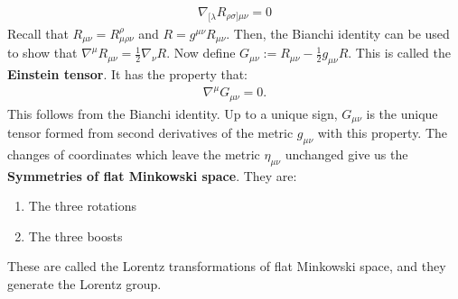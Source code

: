 \documentclass[11pt]{article}
\newcommand{\srmetric}[0]{\eta_{\mu \nu}}
\newcommand{\grmetric}[0]{g_{\mu \nu}}
\theoremstyle{definition}
\begin{document}
\begin{align}
	\boxed{\nabla_{[ \lambda} R_{\rho \sigma]\mu \nu} = 0}	
\end{align}
Recall that \( R_{\mu \nu} = R^{\rho}_{\mu \rho \nu} \) and \( R = g^{\mu \nu} R_{\mu \nu} \). Then, the Bianchi identity can be used to show that \( \nabla^\mu R_{\mu \nu} = \frac{1}{2} \nabla_\nu R \). 
\newline
\newline
Now define \( G_{\mu \nu} := R_{\mu \nu} - \frac{1}{2} g_{\mu \nu} R \). This is called the \textbf{Einstein tensor}. It has the property that: 
\begin{align*}
	\nabla^\mu G_{\mu \nu} = 0.
\end{align*}
This follows from the Bianchi identity. 
\newline
\newline
Up to a unique sign, \( G_{\mu \nu} \) is the unique tensor formed from second derivatives of the metric \( \grmetric \) with this property. The changes of coordinates which leave the metric \( \srmetric \) unchanged give us the \textbf{Symmetries of flat Minkowski space}. They are: 
\begin{enumerate}[noitemsep]
	\item The three rotations
	\item The three boosts 
\end{enumerate}
These are called the Lorentz transformations of flat Minkowski space, and they generate the Lorentz group. 
\end{document}
